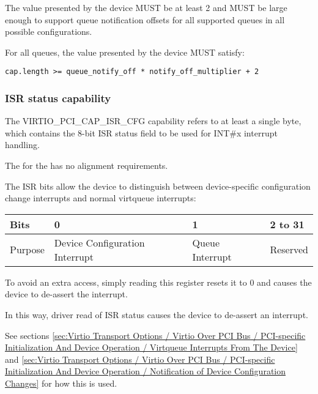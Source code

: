 The value  presented by the device MUST be at least 2
and MUST be large enough to support queue notification offsets
for all supported queues in all possible configurations.

For all queues, the value  presented by the device MUST satisfy:
\begin{lstlisting}
cap.length >= queue_notify_off * notify_off_multiplier + 2
\end{lstlisting}

\subsubsection{ISR status capability}\label{sec:Virtio Transport Options / Virtio Over PCI Bus / PCI Device Layout / ISR status capability}

The VIRTIO_PCI_CAP_ISR_CFG capability
refers to at least a single byte, which contains the 8-bit ISR status field
to be used for INT\#x interrupt handling.

The  for the  has no alignment requirements.

The ISR bits allow the device to distinguish between device-specific configuration
change interrupts and normal virtqueue interrupts:

\begin{tabular}{ |l||l|l|l| }
\hline
Bits       & 0                               & 1               &  2 to 31 \\
\hline
Purpose    & Device Configuration Interrupt  & Queue Interrupt & Reserved \\
\hline
\end{tabular}

To avoid an extra access, simply reading this register resets it to 0 and
causes the device to de-assert the interrupt.

In this way, driver read of ISR status causes the device to de-assert
an interrupt.

See sections \ref{sec:Virtio Transport Options / Virtio Over PCI Bus / PCI-specific Initialization And Device Operation / Virtqueue Interrupts From The Device} and \ref{sec:Virtio Transport Options / Virtio Over PCI Bus / PCI-specific Initialization And Device Operation / Notification of Device Configuration Changes} for how this is used.


